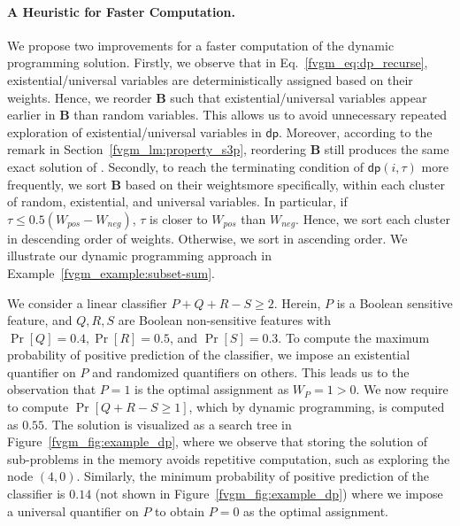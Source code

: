 \paragraph{A Heuristic for Faster Computation.} 
We propose two improvements for a faster computation of the dynamic programming solution. Firstly, we observe that in Eq.~\eqref{fvgm_eq:dp_recurse}, existential/universal variables are deterministically  assigned based on their weights. Hence, we reorder $ \mathbf{B} $ such that existential/universal variables appear earlier in $ \mathbf{B} $ than random variables. This allows us to avoid unnecessary repeated exploration of existential/universal variables in $ \mathsf{dp} $. Moreover, according to the remark in Section~\ref{fvgm_lm:property_s3p}, reordering $ \mathbf{B} $ still produces the same exact solution of {\stochastic}. Secondly, to reach the terminating condition of $ \mathsf{dp}(i, \tau) $ more frequently, we sort $ \mathbf{B} $ based on their weights\textemdash more specifically, within each cluster of random, existential, and universal variables. In particular, if $ \tau \le 0.5(W_{pos} - W_{neg}) $, $ \tau $ is closer to $ W_{pos} $ than $ W_{neg} $. Hence, we sort each cluster in descending order of weights. Otherwise,  we sort in ascending order. We illustrate our dynamic programming approach in Example~\ref{fvgm_example:subset-sum}.
	
\begin{example}\label{fvgm_example:subset-sum}
\normalfont
We consider a linear classifier $ P + Q + R - S \ge 2$. Herein, $ P $ is a Boolean sensitive feature, and $ Q, R, S $ are Boolean non-sensitive features with $ \Pr[Q] = 0.4,  \Pr[R] = 0.5 $, and $ \Pr[S] = 0.3 $. To compute the maximum probability of positive prediction of the classifier,  we impose an existential quantifier on $P$ and randomized quantifiers on others. This leads us to the observation that $ P = 1 $ is the optimal assignment as $ W_P = 1 > 0 $. We now require to compute $ \Pr[Q + R - S \ge 1] $, which by dynamic programming, is computed as $ 0.55 $. The solution is visualized as a search tree in Figure~\ref{fvgm_fig:example_dp}, where we observe that storing the solution of sub-problems in the memory avoids repetitive computation, such as exploring the node $ (4,0) $. Similarly, the minimum probability of positive prediction  of the classifier is $ 0.14 $ (not shown in Figure~\ref{fvgm_fig:example_dp}) where we impose a universal quantifier on $P$ to obtain $ P = 0 $ as the optimal assignment. 
\end{example}

	
	
